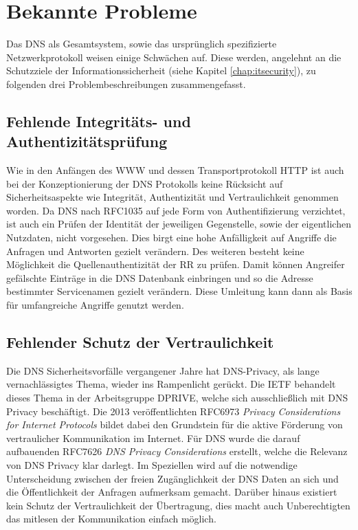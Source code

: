 \chapter{Bekannte Probleme}
\label{chap:threads}

Das DNS als Gesamtsystem, sowie das ursprünglich spezifizierte Netzwerkprotokoll weisen einige Schwächen auf. Diese werden, angelehnt an die Schutzziele der Informationssicherheit (siehe Kapitel \ref{chap:itsecurity}), zu folgenden drei Problembeschreibungen zusammengefasst.   

\section{Fehlende Integritäts- und Authentizitätsprüfung}
\label{sec:thread-auth}

Wie in den Anfängen des \ac{WWW} und dessen Transportprotokoll \ac{HTTP} ist auch bei der Konzeptionierung der DNS Protokolls keine Rücksicht auf Sicherheitsaspekte wie Integrität, Authentizität und Vertraulichkeit genommen worden. Da DNS nach RFC1035\cite{rfc1035} auf jede Form von Authentifizierung verzichtet, ist auch ein Prüfen der Identität der jeweiligen Gegenstelle, sowie der eigentlichen Nutzdaten, nicht vorgesehen. Dies birgt eine hohe Anfälligkeit auf Angriffe die Anfragen und Antworten gezielt verändern. Des weiteren besteht keine Möglichkeit die Quellenauthentizität der RR zu prüfen. Damit können Angreifer gefälschte Einträge in die DNS Datenbank einbringen und so die Adresse bestimmter Servicenamen gezielt verändern. Diese Umleitung kann dann als Basis für umfangreiche Angriffe genutzt werden.

\section{Fehlender Schutz der Vertraulichkeit}
\label{sec:thread-priv}

Die DNS Sicherheitsvorfälle vergangener Jahre hat DNS-Privacy, als lange vernachlässigtes Thema, wieder ins Rampenlicht gerückt\cite{Greenwald2013}\cite{turkybbc2017}\cite{turkywp2018}. Die \ac{IETF} behandelt dieses Thema in der Arbeitsgruppe DPRIVE, welche sich ausschließlich mit DNS Privacy beschäftigt. Die 2013 veröffentlichten RFC6973 \textit{Privacy Considerations for Internet Protocols}\cite{rfc6973} bildet dabei den Grundstein für die aktive Förderung von vertraulicher Kommunikation im Internet. Für DNS wurde die darauf aufbauenden RFC7626 \textit{DNS Privacy Considerations}\cite{rfc7626} erstellt, welche die Relevanz von DNS Privacy klar darlegt. Im Speziellen wird auf die notwendige Unterscheidung zwischen der freien Zugänglichkeit der DNS Daten an sich und die Öffentlichkeit der Anfragen aufmerksam gemacht. Darüber hinaus existiert kein Schutz der Vertraulichkeit der Übertragung, dies macht auch Unberechtigten das mitlesen der Kommunikation einfach möglich.

